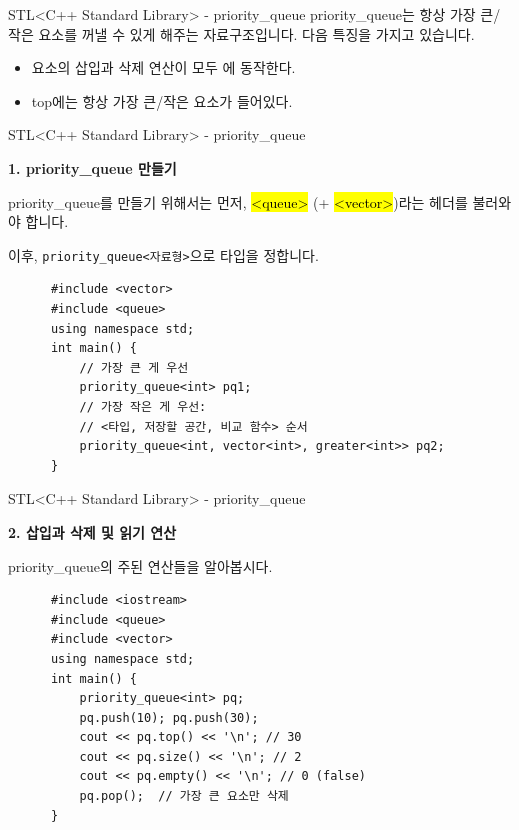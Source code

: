 
\begin{frame}{STL}{<C++ Standard Library> - priority\_queue}
  \vspace{6mm}
  \alert{priority\_queue}는 항상 가장 큰/작은 요소를 꺼낼 수 있게 해주는 자료구조입니다.
  다음 특징을 가지고 있습니다.
  \vspace{4mm}
  \begin{itemize}
    \item 요소의 삽입과 삭제 연산이 모두 에 동작한다.
    \item top에는 항상 가장 큰/작은 요소가 들어있다.
  \end{itemize}
\end{frame}

\begin{frame}[fragile]{STL}{<C++ Standard Library> - priority\_queue}
  \begin{twocol}
    \vspace{6mm}
    \textbf{1. priority\_queue 만들기}\par\vspace{2mm}
    priority\_queue를 만들기 위해서는 먼저, \hl{<queue>} (+ \hl{<vector>})라는 헤더를
    불러와야 합니다.\par\vspace{2mm}
    이후, \texttt{priority\_queue<자료형>}으로 타입을 정합니다.
  \colsplit
    \begin{verbatim}
      #include <vector>
      #include <queue>
      using namespace std;
      int main() {
          // 가장 큰 게 우선
          priority_queue<int> pq1;
          // 가장 작은 게 우선:
          // <타입, 저장할 공간, 비교 함수> 순서
          priority_queue<int, vector<int>, greater<int>> pq2;
      }
    \end{verbatim}
  \end{twocol}
\end{frame}

\begin{frame}[fragile]{STL}{<C++ Standard Library> - priority\_queue}
  \begin{twocol}
    \vspace{8mm}
    \textbf{2. 삽입과 삭제 및 읽기 연산}\par\vspace{2mm}
    priority\_queue의 주된 연산들을 알아봅시다.
  \colsplit
    \begin{verbatim}
      #include <iostream>
      #include <queue>
      #include <vector>
      using namespace std;
      int main() {
          priority_queue<int> pq;
          pq.push(10); pq.push(30);
          cout << pq.top() << '\n'; // 30
          cout << pq.size() << '\n'; // 2
          cout << pq.empty() << '\n'; // 0 (false)
          pq.pop();  // 가장 큰 요소만 삭제
      }
    \end{verbatim}
  \end{twocol}
\end{frame}

